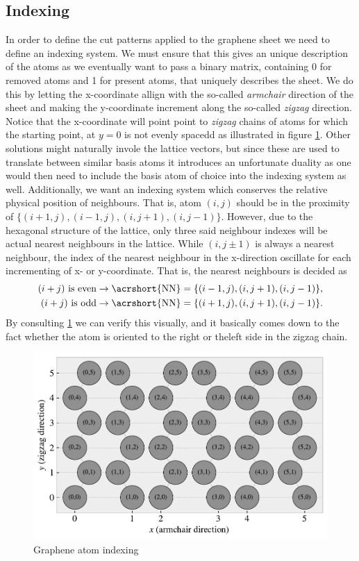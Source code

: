 \subsection{Indexing}
In order to define the cut patterns applied to the graphene sheet we need to
define an indexing system. We must ensure that this gives an unique description
of the atoms as we eventually want to pass a binary matrix, containing 0 for
removed atoms and 1 for present atoms, that uniquely describes the sheet. We do
this by letting the x-coordinate allign with the so-called \textit{armchair}
direction of the sheet and making the y-coordinate increment along the
so-called \textit{zigzag} direction. Notice that the x-coordinate will point
point to \textit{zigzag} chains of atoms for which the starting point, at $y = 0$ is not evenly spacedd as illustrated in figure \cref{fig:atom_indexing}. Other solutions
might naturally invole the lattice vectors, but since these are used to
translate between similar basis atoms it introduces an unfortunate duality as
one would then need to include the basis atom of choice into the indexing system
as well. Additionally, we want an indexing system which conserves the relative
physical position of neighbours. That is, atom $(i, j)$ should be in the
proximity of $\{(i+1, j), (i-1, j), (i, j+1), (i, j-1)\}$. However, due to the hexagonal structure of the lattice, only three said neighbour indexes will be actual nearest neighbours in the lattice. While $(i, j\pm 1)$ is always a nearest neighbour, the index of the nearest neighbour in the x-direction oscillate for each incrementing of x- or y-coordinate. That is, the nearest neighbours is decided as
\begin{equation}
  \begin{aligned}
    (i + j) \ \text{is even} &\rightarrow \text{\acrshort{NN}} = \{(i-1, j), (i, j+1), (i, j-1)\}, \\
    (i + j) \ \text{is odd} &\rightarrow \text{\acrshort{NN}} = \{(i+1, j), (i, j+1), (i, j-1)\}.
  \end{aligned}
  \label{eq:atom_neigh_idx}
\end{equation}
By consulting \cref{fig:atom_indexing} we can verify this visually, and it basically comes down to the fact whether the atom is oriented to the right or theleft side in the zigzag chain.

\begin{figure}[H]
  \centering
  \includegraphics[width=0.7\linewidth]{figures/system/atom_indexing.pdf}
  \caption{Graphene atom indexing}
  \label{fig:atom_indexing}
\end{figure}



